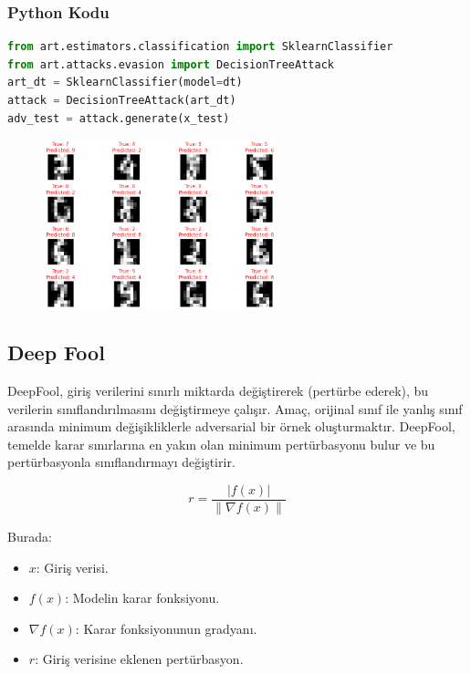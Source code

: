 \subsubsection{Python Kodu}

\begin{lstlisting}[language=Python]
from art.estimators.classification import SklearnClassifier
from art.attacks.evasion import DecisionTreeAttack
art_dt = SklearnClassifier(model=dt)
attack = DecisionTreeAttack(art_dt)
adv_test = attack.generate(x_test)
\end{lstlisting}

\begin{figure}[h]
    \centering
    \includegraphics[width=0.6\textwidth]{images/dt_attack_results.png}
    \caption{}
\end{figure}

\newpage

\subsection{Deep Fool}

DeepFool, giriş verilerini sınırlı miktarda değiştirerek (pertürbe ederek), bu verilerin sınıflandırılmasını değiştirmeye çalışır. Amaç, orijinal sınıf ile yanlış sınıf arasında minimum değişikliklerle adversarial bir örnek oluşturmaktır. DeepFool, temelde karar sınırlarına en yakın olan minimum pertürbasyonu bulur ve bu pertürbasyonla sınıflandırmayı değiştirir.

\[ r = \frac{| f(x) |}{\|\nabla f(x)\|} \]

Burada:

\begin{itemize}
    \item $x$: Giriş verisi.
    \item $f(x)$: Modelin karar fonksiyonu.
    \item $\nabla f(x)$: Karar fonksiyonunun gradyanı.
    \item $r$: Giriş verisine eklenen pertürbasyon.
\end{itemize}

